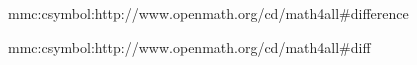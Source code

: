 \startsetups mmc:csymbol:http://www.openmath.org/cd/math4all\string#difference
    \MMLcreset
    \Delta\getXMLstackdata\plustwo
\stopsetups


\startsetups mmc:csymbol:http://www.openmath.org/cd/math4all\string#diff
    \MMLcreset
     {
        \getXMLstackdata\plusthree
    }
\stopsetups

\protect \endinput
